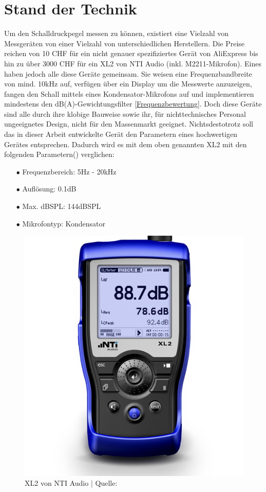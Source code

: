 \documentclass[12pt]{article}
\begin{document}
	\section{Stand der Technik}\label{Stand}
	Um den Schalldruckpegel messen zu können, existiert eine Vielzahl von Messgeräten von einer Vielzahl von unterschiedlichen Herstellern. Die Preise  reichen von 10 CHF für ein nicht genauer spezifiziertes Gerät von AliExpress bis hin zu über 3000 CHF für ein XL2 von NTI Audio (inkl. M2211-Mikrofon). Eines haben jedoch alle diese Geräte gemeinsam. Sie weisen eine Frequenzbandbreite von mind. 10kHz auf, verfügen über ein Display um die Messwerte anzuzeigen, fangen den Schall mittels eines Kondensator-Mikrofons auf und implementieren mindestens den dB(A)-Gewichtungsfilter \ref{Frequenzbewertung}. Doch diese Geräte sind alle durch ihre klobige Bauweise sowie ihr, für nichttechnisches Personal ungeeignetes Design, nicht für den Massenmarkt geeignet. Nichtsdestotrotz soll das in dieser Arbeit entwickelte Gerät den Parametern eines hochwertigen Gerätes entsprechen. Dadurch wird es mit dem oben genannten XL2 mit den folgenden Parametern(\cite{noauthor_xl2_nodate}) verglichen:
	\begin{itemize}[topsep=10pt,partopsep=0pt,labelwidth=5cm,align=left,itemindent=5cm]
		\item[$\bullet$ Frequenzbereich:]  5Hz - 20kHz
		\item[$\bullet$ Auflösung:]  0.1dB
		\item[$\bullet$ Max. dBSPL:]  144dBSPL
		\item[$\bullet$ Mikrofontyp:]  Kondensator
	\end{itemize}
	\begin{figure}[H]
		\centering
		\includegraphics[width=0.4\linewidth]{images/BAT_NTi-Audio-XL2-500}
		\caption{XL2 von NTI Audio $\vert$ Quelle: \cite{noauthor_xl2_nodate}}
		\label{fig:batnti-audio-xl2-500}
	\end{figure}
		
\end{document}
